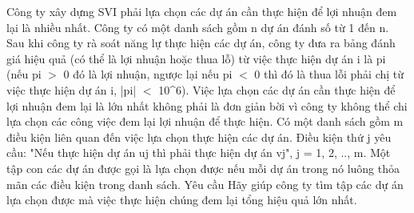 Công ty xây dựng SVI phải lựa chọn các dự án cần thực hiện để lợi nhuận đem lại là nhiều nhất. Công ty có một danh sách gồm n dự án đánh số từ 1 đến n. Sau khi công ty rà soát năng lự thực hiện các dự án, công ty đưa ra bảng đánh giá hiệu quả (có thể là lợi nhuận hoặc thua lỗ) từ việc thực hiện dự án i là pi (nếu pi $>$ 0 đó là lợi nhuận, ngược lại nếu pi $<$ 0 thì đó là thua lỗi phải chị từ việc thực hiện dự án i, |pi| $<$ 10^6). Việc lựa chọn các dự án cần thực hiện để lợi nhuận đem lại là lớn nhất không phải là đơn giản bời vì công ty không thể chi lựa chọn các công việc đem lại lợi nhuận để thực hiện. Có một danh sách gồm m điều kiện liên quan đến việc lựa chọn thực hiện các dự án. Điều kiện thứ j yêu cầu: "Nếu thực hiện dự án uj thì phải thực hiện dự án vj", j = 1, 2, .., m. Một tập con các dự án được gọi là lựa chọn được nếu mỗi dự án trong nó luông thỏa mãn các điều kiện trong danh sách.
Yêu cầu
Hãy giúp công ty tìm tập các dự án lựa chọn được mà việc thực hiện chúng đem lại tổng hiệu quả lớn nhất.